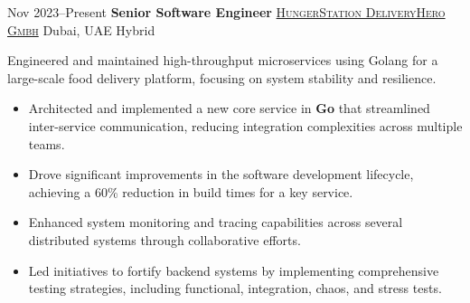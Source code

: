\documentclass{subfiles}
\begin{document}
\cventry
    {Nov 2023--Present}
    {\textbf{Senior Software Engineer}}
    {\textsc{\href{https://hungerstation.com}{HungerStation DeliveryHero Gmbh}}}
    {Dubai, UAE}
    {Hybrid}
    {
Engineered and maintained high-throughput microservices using Golang for a large-scale food delivery platform, focusing on system stability and resilience.
\begin{itemize}
    \item Architected and implemented a new core service in \textbf{Go} that streamlined inter-service communication, reducing integration complexities across multiple teams.
	\item Drove significant improvements in the software development lifecycle, achieving a 60\% reduction in build times for a key service.
    \item Enhanced system monitoring and tracing capabilities across several distributed systems through collaborative efforts.
	\item Led initiatives to fortify backend systems by implementing comprehensive testing strategies, including functional, integration, chaos, and stress tests.
\end{itemize}
}
\end{document}
